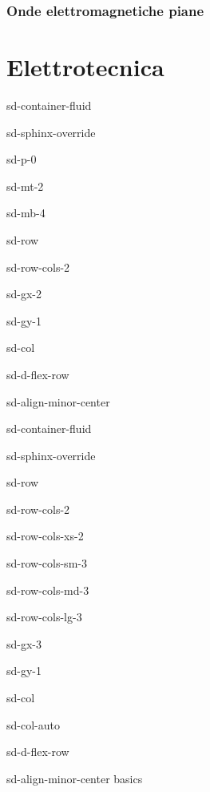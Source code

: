 \documentclass[letterpaper,10pt,english]{jupyterBook}
\begin{document}
\section{Onde elettromagnetiche piane}
\label{\detokenize{ch/waves-plane:onde-elettromagnetiche-piane}}\label{\detokenize{ch/waves-plane:classical-electromagnetism-waves-plane-waves}}\label{\detokenize{ch/waves-plane::doc}}
\sphinxstepscope


\part{Elettrotecnica}

\sphinxstepscope

\begin{sphinxuseclass}{sd-container-fluid}
\begin{sphinxuseclass}{sd-sphinx-override}
\begin{sphinxuseclass}{sd-p-0}
\begin{sphinxuseclass}{sd-mt-2}
\begin{sphinxuseclass}{sd-mb-4}
\begin{sphinxuseclass}{sd-row}
\begin{sphinxuseclass}{sd-row-cols-2}
\begin{sphinxuseclass}{sd-gx-2}
\begin{sphinxuseclass}{sd-gy-1}
\begin{sphinxuseclass}{sd-col}
\begin{sphinxuseclass}{sd-d-flex-row}
\begin{sphinxuseclass}{sd-align-minor-center}
\begin{sphinxuseclass}{sd-container-fluid}
\begin{sphinxuseclass}{sd-sphinx-override}
\begin{sphinxuseclass}{sd-row}
\begin{sphinxuseclass}{sd-row-cols-2}
\begin{sphinxuseclass}{sd-row-cols-xs-2}
\begin{sphinxuseclass}{sd-row-cols-sm-3}
\begin{sphinxuseclass}{sd-row-cols-md-3}
\begin{sphinxuseclass}{sd-row-cols-lg-3}
\begin{sphinxuseclass}{sd-gx-3}
\begin{sphinxuseclass}{sd-gy-1}
\begin{sphinxuseclass}{sd-col}
\begin{sphinxuseclass}{sd-col-auto}
\begin{sphinxuseclass}{sd-d-flex-row}
\begin{sphinxuseclass}{sd-align-minor-center}
\sphinxAtStartPar
basics


\end{sphinxuseclass}
\end{sphinxuseclass}
\end{sphinxuseclass}
\end{sphinxuseclass}
\end{sphinxuseclass}
\end{sphinxuseclass}
\end{sphinxuseclass}
\end{sphinxuseclass}
\end{sphinxuseclass}
\end{sphinxuseclass}
\end{sphinxuseclass}
\end{sphinxuseclass}
\end{sphinxuseclass}
\end{sphinxuseclass}
\end{sphinxuseclass}
\end{sphinxuseclass}
\end{sphinxuseclass}
\end{sphinxuseclass}
\end{sphinxuseclass}
\end{sphinxuseclass}
\end{sphinxuseclass}
\end{sphinxuseclass}
\end{sphinxuseclass}
\end{sphinxuseclass}
\end{sphinxuseclass}
\end{sphinxuseclass}
\end{document}
